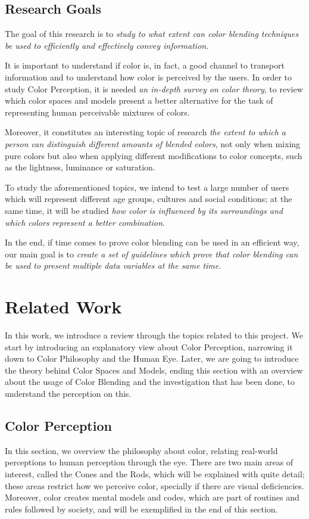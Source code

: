 \documentclass{report}
\begin{document}
\section{Research Goals}

The goal of this research is to \emph{study to what extent can color blending techniques be used to efficiently and
effectively convey information}.\par
It is important to understand if color is, in fact, a good channel to transport information and to understand how color
is perceived by the users. In order to study Color Perception, it is needed \emph{an in-depth survey on color theory}, to
review which color spaces and models present a better alternative for the task of representing human perceivable mixtures
of colors. \par
Moreover, it constitutes an interesting topic of research \emph{the extent to which a person can distinguish different amounts
of blended colors}, not only when mixing pure colors but also when applying different modifications to color concepts, such
as the lightness, luminance or saturation. \par
To study the aforementioned topics, we intend to test a large number of users which will represent different age groups,
cultures and social conditions; at the same time, it will be studied \emph{how color is influenced by its surroundings and which
colors represent a better combination}. \par
In the end, if time comes to prove color blending can be used in an efficient way, our main goal is to \emph{create a set of
guidelines which prove that color blending can be used to present multiple data variables at the same time}.

\chapter{Related Work}
In this work, we introduce a review through the topics related to this project. We start by introducing
an explanatory view about Color Perception, narrowing it down to Color Philosophy and the Human Eye. Later, we are going to introduce the theory behind Color Spaces and Models, ending this
section with an overview about the usage of Color Blending and the investigation that has been done, to
understand the perception on this.
%
\section{Color Perception}
\label{sec:colorp}
In this section, we overview the philosophy about color, relating real-world perceptions to human perception
through the eye. There are two main areas of interest, called the Cones and the Rods, which will be explained
with quite detail; these areas restrict how we perceive color, specially if there are visual deficiencies.
Moreover, color creates mental models and codes, which are part of routines and rules followed by society, and will be exemplified in the end of this section.
%
\end{document}
